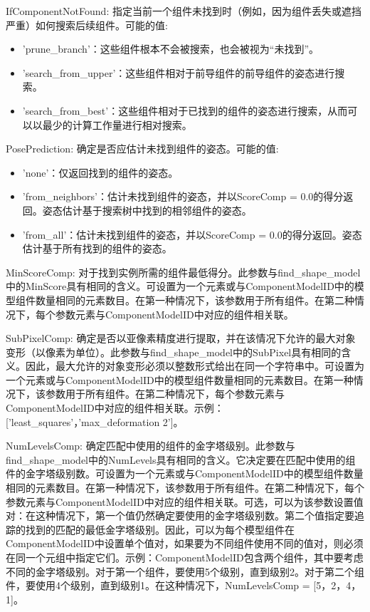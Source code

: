 \documentclass{article}
\begin{document}
IfComponentNotFound: 指定当前一个组件未找到时（例如，因为组件丢失或遮挡严重）如何搜索后续组件。可能的值:
\begin{itemize}
	\item ’prune\_branch’：这些组件根本不会被搜索，也会被视为“未找到”。

	\item ’search\_from\_upper’：这些组件相对于前导组件的前导组件的姿态进行搜索。

	\item ’search\_from\_best’：这些组件相对于已找到的组件的姿态进行搜索，从而可以以最少的计算工作量进行相对搜索。
\end{itemize}

PosePrediction: 确定是否应估计未找到组件的姿态。可能的值:
\begin{itemize}
	\item ’none’：仅返回找到的组件的姿态。

	\item ’from\_neighbors’：估计未找到组件的姿态，并以ScoreComp = 0.0的得分返回。姿态估计基于搜索树中找到的相邻组件的姿态。

	\item ’from\_all’：估计未找到组件的姿态，并以ScoreComp = 0.0的得分返回。姿态估计基于所有找到的组件的姿态。
\end{itemize}

MinScoreComp: 对于找到实例所需的组件最低得分。此参数与find\_shape\_model中的MinScore具有相同的含义。可设置为一个元素或与ComponentModelID中的模型组件数量相同的元素数目。在第一种情况下，该参数用于所有组件。在第二种情况下，每个参数元素与ComponentModelID中对应的组件相关联。

SubPixelComp: 确定是否以亚像素精度进行提取，并在该情况下允许的最大对象变形（以像素为单位）。此参数与find\_shape\_model中的SubPixel具有相同的含义。因此，最大允许的对象变形必须以整数形式给出在同一个字符串中。可设置为一个元素或与ComponentModelID中的模型组件数量相同的元素数目。在第一种情况下，该参数用于所有组件。在第二种情况下，每个参数元素与ComponentModelID中对应的组件相关联。示例：['least\_squares'，'max\_deformation 2']。

NumLevelsComp: 确定匹配中使用的组件的金字塔级别。此参数与find\_shape\_model中的NumLevels具有相同的含义。它决定要在匹配中使用的组件的金字塔级别数。可设置为一个元素或与ComponentModelID中的模型组件数量相同的元素数目。在第一种情况下，该参数用于所有组件。在第二种情况下，每个参数元素与ComponentModelID中对应的组件相关联。可选，可以为该参数设置值对：在这种情况下，第一个值仍然确定要使用的金字塔级别数。第二个值指定要追踪的找到的匹配的最低金字塔级别。因此，可以为每个模型组件在ComponentModelID中设置单个值对，如果要为不同组件使用不同的值对，则必须在同一个元组中指定它们。示例：ComponentModelID包含两个组件，其中要考虑不同的金字塔级别。对于第一个组件，要使用5个级别，直到级别2。对于第二个组件，要使用4个级别，直到级别1。在这种情况下，NumLevelsComp = [5，2，4，1]。
\end{document}

